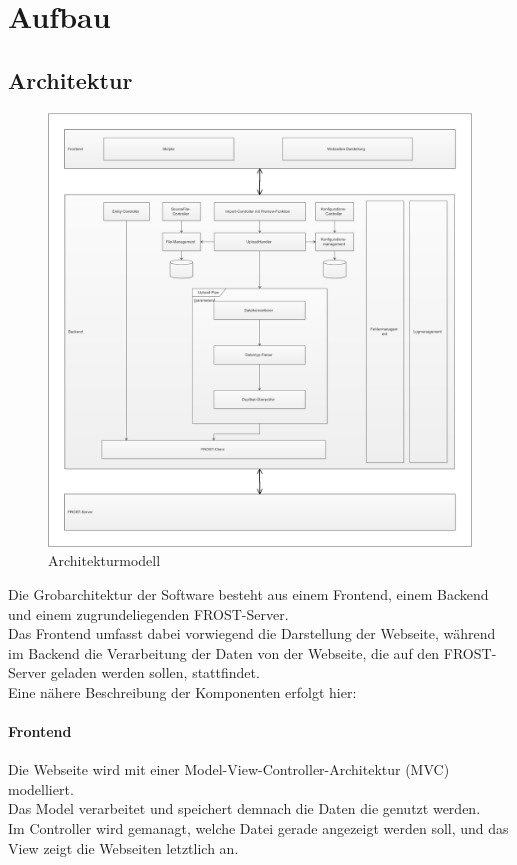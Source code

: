 \section{Aufbau}

\subsection{Architektur}
\begin{figure}[htbp]
\centering
\includegraphics[scale=0.44]{uml/architektur.eps}
\caption{\label{fig:architektur} Architekturmodell}
\end{figure}
\noindent Die Grobarchitektur der Software besteht aus einem Frontend, einem Backend und einem zugrundeliegenden FROST-Server.\\
 Das Frontend umfasst dabei vorwiegend die Darstellung der Webseite, während im Backend die Verarbeitung der Daten von der Webseite, die auf den FROST-Server geladen werden sollen, stattfindet. \\
 Eine nähere Beschreibung der Komponenten erfolgt hier:

\paragraph{Frontend}
Die Webseite wird mit einer Model-View-Controller-Architektur (MVC) modelliert.\\
Das Model verarbeitet und speichert demnach die Daten die genutzt werden.\\
Im Controller wird gemanagt, welche Datei gerade angezeigt werden soll, und das View zeigt die Webseiten letztlich an.

